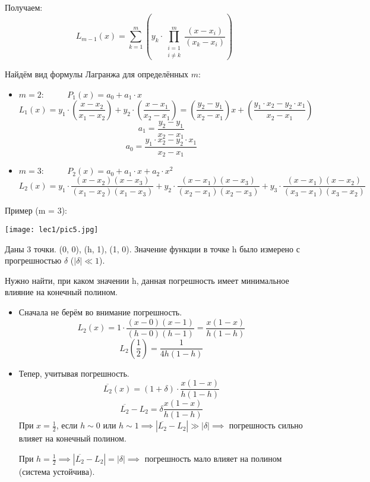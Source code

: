 \documentclass[12pt]{article}
\begin{document}
Получаем:
\[
	L_{m-1}(x) =
	\sum_{k = 1}^{m} \left(y_k \cdot
	\prod_{\substack{i=1 \\ i \neq k}}^{m}
	\frac{(x-x_i)}{(x_k-x_i)}\right)
\]

Найдём вид формулы Лагранжа для определённых \( m \):
\begin{itemize}
	\item \( m = 2: \hspace{32pt} P_1(x) = a_0 + a_1 \cdot x \)
	      \[
		      L_1(x) = y_1 \cdot \left(\frac{x-x_2}{x_1-x_2}\right) +
		      y_2 \cdot \left(\frac{x-x_1}{x_2-x_1}\right) =
		      \left(\frac{y_2-y_1}{x_2 - x_1}\right) x +
		      \left(\frac{y_1 \cdot x_2 - y_2 \cdot x_1}{x_2 - x_1}\right)
	      \]
	      \[ a_1 = \frac{y_2-y_1}{x_2 - x_1} \]
	      \[ a_0 = \frac{y_1 \cdot x_2 - y_2 \cdot x_1}{x_2 - x_1} \]
	\item \( m = 3: \hspace{32pt} P_2(x) = a_0 + a_1 \cdot x + a_2 \cdot x^2 \)
	      \[
		      L_2(x) = y_1 \cdot \frac{(x-x_2)(x-x_3)}{(x_1-x_2)(x_1-x_3)} +
		      y_2 \cdot \frac{(x-x_1)(x-x_3)}{(x_2-x_1)(x_2-x_3)} +
		      y_3 \cdot \frac{(x-x_1)(x-x_2)}{(x_3-x_1)(x_3-x_2)}
	      \]
\end{itemize}

Пример (m = 3):

\vspace{4pt}

\texttt{[image: lec1/pic5.jpg]}

Даны 3 точки. (0, 0), (h, 1), (1, 0).
Значение функции в точке h было измерено с прогрешностью \( \delta \)
(\( |\delta| \ll 1 \)).

Нужно найти, при каком значении h, данная погрешность имеет минимальное
влияние на конечный полином.

\begin{itemize}
	\item Сначала не берём во внимание погрешность.
	      \[
		      L_2(x) = 1 \cdot \frac{(x-0)(x-1)}{(h-0)(h-1)} = \frac{x(1-x)}{h(1-h)}
	      \]
	      \[
		      L_2\left(\frac{1}{2}\right) = \frac{1}{4h(1-h)}
	      \]
	\item Тепер, учитывая погрешность.
	      \[
		      \overline{L_2}(x) = (1 + \delta) \cdot
		      \frac{x(1-x)}{h(1-h)}
	      \]
	      \[
		      \overline{L_2} - L_2 = \delta \frac{x(1-x)}{h(1-h)}
	      \]
	      При \( x = \frac{1}{2} \), если \( h \sim 0 \) или \( h \sim 1 \implies
	      |\overline{L_2} - L_2| \gg |\delta| \implies \) погрешность сильно
	      влияет на конечный полином.

	      При \( h = \frac{1}{2} \implies |\overline{L_2} - L_2| = |\delta|
	      \implies \) погрешность мало влияет на полином (система устойчива).
\end{itemize}
\end{document}
